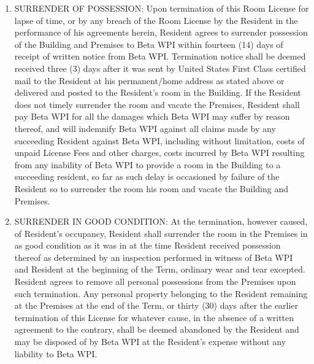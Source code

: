 \documentclass[legalpaper, 12pt]{article}
\begin{document}
\begin{enumerate}
        \item\label{itm:surrender} SURRENDER OF POSSESSION\@: Upon termination
                of this Room License for lapse of time, or by any breach of the
                Room License by the Resident in the performance of his
                agreements herein, Resident agrees to surrender possession of
                the Building and Premises to Beta WPI within fourteen (14) days
                of receipt of written notice from Beta WPI\@.  Termination
                notice shall be deemed received three (3) days after it was
                sent by United States First Class certified mail to the
                Resident at his permanent/home address as stated above or
                delivered and posted to the Resident’s room in the Building.
                If the Resident does not timely surrender the room and vacate
                the Premises, Resident shall pay Beta WPI for all the damages
                which Beta WPI may suffer by reason thereof, and will indemnify
                Beta WPI against all claims made by any succeeding Resident
                against Beta WPI, including without limitation, costs of unpaid
                License Fees and other charges, costs incurred by Beta WPI
                resulting from any inability of Beta WPI to provide a room in
                the Building to a succeeding resident, so far as such delay is
                occasioned by failure of the Resident so to surrender the room
                his room and vacate the Building  and Premises.

        \item\label{itm:goodcondition} SURRENDER IN GOOD CONDITION\@: At the
                termination, however caused, of Resident’s occupancy, Resident
                shall surrender the room in the Premises in as good condition
                as it was in at the time Resident received possession thereof
                as determined by an inspection performed in witness of Beta WPI
                and Resident at the beginning of the Term, ordinary wear and
                tear excepted.  Resident agrees to remove all personal
                possessions from the Premises upon such termination.  Any
                personal property belonging to the Resident remaining at the
                Premises at the end of the Term, or thirty (30) days after the
                earlier termination of this License for whatever cause, in the
                absence of a written agreement to the contrary, shall be deemed
                abandoned by the Resident and may be disposed of by Beta WPI at
                the Resident’s expense without any liability to Beta WPI\@.


\end{enumerate}
\end{document}
